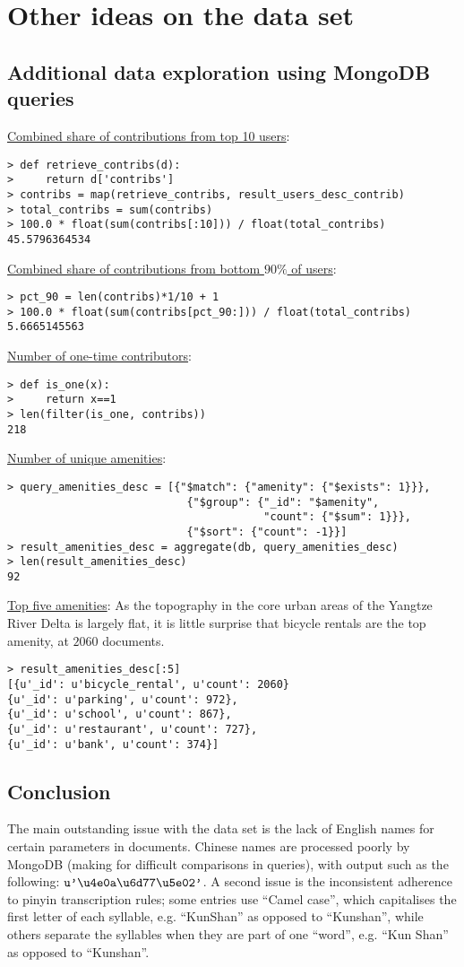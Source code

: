\documentclass{article}
\begin{document}
\section{Other ideas on the data set}
\subsection{Additional data exploration using MongoDB queries}
\underline{Combined share of contributions from top 10 users}:
\begin{verbatim}
> def retrieve_contribs(d):
>     return d['contribs']
> contribs = map(retrieve_contribs, result_users_desc_contrib)
> total_contribs = sum(contribs)
> 100.0 * float(sum(contribs[:10])) / float(total_contribs)
45.5796364534
\end{verbatim}

\underline{Combined share of contributions from bottom $90\%$ of users}:
\begin{verbatim}
> pct_90 = len(contribs)*1/10 + 1
> 100.0 * float(sum(contribs[pct_90:])) / float(total_contribs)
5.6665145563
\end{verbatim}

\underline{Number of one-time contributors}:
\begin{verbatim}
> def is_one(x):
>     return x==1
> len(filter(is_one, contribs))
218
\end{verbatim}

\underline{Number of unique amenities}:
\begin{verbatim}
> query_amenities_desc = [{"$match": {"amenity": {"$exists": 1}}},
                            {"$group": {"_id": "$amenity",
                                        "count": {"$sum": 1}}},
                            {"$sort": {"count": -1}}]
> result_amenities_desc = aggregate(db, query_amenities_desc)
> len(result_amenities_desc)
92
\end{verbatim}

\underline{Top five amenities}:
As the topography in the core urban areas of the Yangtze River Delta is largely flat, it is little surprise that bicycle rentals are the top amenity, at $\num{2060}$ documents.
\begin{verbatim}
> result_amenities_desc[:5]
[{u'_id': u'bicycle_rental', u'count': 2060}
{u'_id': u'parking', u'count': 972},
{u'_id': u'school', u'count': 867},
{u'_id': u'restaurant', u'count': 727},
{u'_id': u'bank', u'count': 374}]
\end{verbatim}

\subsection{Conclusion}
The main outstanding issue with the data set is the lack of English names for certain parameters in documents. Chinese names are processed poorly by MongoDB (making for difficult comparisons in queries), with output such as the following: $\verb+u'\u4e0a\u6d77\u5e02'+$. A second issue is the inconsistent adherence to pinyin transcription rules; some entries use ``Camel case'', which capitalises the first letter of each syllable, e.g. ``KunShan'' as opposed to ``Kunshan'', while others separate the syllables when they are part of one ``word'', e.g. ``Kun Shan'' as opposed to ``Kunshan''.
\end{document}
